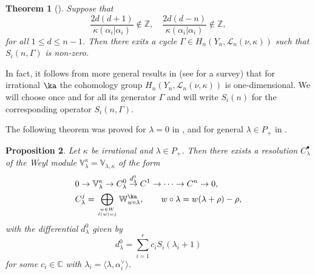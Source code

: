 \documentclass{amsart}
\newcommand{\Wak}[2]{\mathbb{W}_{#1}^{#2}}
\newcommand{\bra}{{\langle}}
\newcommand{\ket}{{\rangle}}
\newcommand{\+}{\mathop{\oplus}}
\renewcommand{\*}{{\otimes}}
\newcommand{\mc}{\mathcal}
\newcommand{\Z}{\mathbb{Z}}
\newcommand{\C}{\mathbb{C}}
\newcommand{\ra}{\rightarrow}
\newcommand{\lam}{\lambda}
\def\leq{\leqslant}
\theoremstyle{theorem}
\newtheorem{Th}{Theorem}[section]
\newtheorem{Pro}[Th]{Proposition}
\theoremstyle{remark}
\numberwithin{equation}{section}
\begin{document}
\begin{Th}[\cite{TsuKan86}]\label{Th:Tsuhiya-Kanie}
Suppose that
$$\frac{2d(d+1)}{\kappa(\alpha_i|\alpha_i)}\not\in \Z,\quad
\frac{2d(d-n)}{\kappa(\alpha_i|\alpha_i)}\not\in \Z,
$$
for all $1\leq d\leq n-1$.
Then there exits a cycle
$\Gamma\in H_{n}(Y_{n},\mc{L}_n(\nu,\kappa))$ such that  
$S_i(n,\Gamma)$ %
is non-zero.
\end{Th}

In fact, it follows from more general results in \cite{SV,Varchenko}
(see \cite{FF93} for a survey) that for irrational $\ka$ the
cohomology group $H_{n}(Y_{n},\mc{L}_n(\nu,\kappa))$ is
one-dimensional. We will choose once and for all its generator
$\Gamma$ and will write $S_i(n)$ for the corresponding operator
$S_i(n,\Gamma)$.

The following theorem was proved for $\lam=0$ in \cite{FF}, and for
general $\lam \in P_+$ in \cite{ACL17}.

\begin{Pro}\label{Pro:resolution-weyl}
Let $\kappa$ be irrational and $\lam\in P_+$.
Then there exists a resolution $C^\bullet_\lam$
of the Weyl module $\mathbb{V}_\lam^\kappa = \mathbb{V}_{\lam,\kappa}$
of the form
\begin{align}    \label{resWak}
&0\ra \mathbb{V}_\lam^\kappa \ra C^0_\lam\overset{d^0_\lam}{\ra} C^1\ra\dots \ra
C^n\ra 0,\\ \notag
& C^j_\lam=\bigoplus_{w\in W\atop \ell(w)=j}\Wak{w\circ \lam}{\ka}, \qquad
w \circ \lam = w(\lam+\rho)-\rho,
\end{align}
with the differential $d^0_\lam$ given by
\begin{equation}    \label{d0}
d^0_\lam=\sum_{i=1}^{r} c_i S_i(\lam_i+1)
\end{equation}
for some $c_i \in \C$ with $\lam_i=\bra \lam,\alpha_i^\vee\ket$.
\end{Pro}
\end{document}
